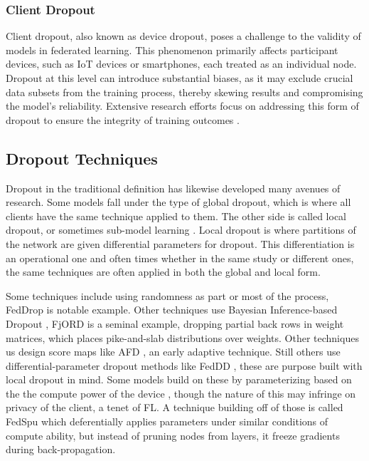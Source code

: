 \documentclass{article}
\begin{document}
\subsubsection{Client Dropout}
Client dropout, also known as device dropout, poses a challenge to the validity of models in federated learning. This phenomenon primarily affects participant devices, such as IoT devices or smartphones, each treated as an individual node. Dropout at this level can introduce substantial biases, as it may exclude crucial data subsets from the training process, thereby skewing results and compromising the model's reliability. Extensive research efforts focus on addressing this form of dropout to ensure the integrity of training outcomes \cite{mao2022communication, lim2021decentralized, shao2022dres}.

\subsection{Dropout Techniques}
Dropout in the traditional definition has likewise developed many avenues of research. Some models fall under the type of global dropout, which is where all clients have the same technique applied to them. The other side is called local dropout, or sometimes sub-model learning \cite{jia2022x}. Local dropout is where partitions of the network are given differential parameters for dropout. This differentiation is an operational one and often times whether in the same study or different ones, the same techniques are often applied in both the global and local form.

Some techniques include using randomness as part or most of the process\cite{wen2022federated,caldas2018expanding}, FedDrop is notable example. Other techniques use Bayesian Inference-based Dropout \cite{gal2016theoretically, xue2023fedbiad}, FjORD \cite{horvath2021fjord} is a seminal example, dropping partial back rows in weight matrices, which places pike-and-slab distributions over weights. Other techniques us design score maps like AFD \cite{nader2020adaptive}, an early adaptive technique. Still others use differential-parameter dropout methods like FedDD \cite{feng2023feddd,nader2020adaptive}, these are purpose built with local dropout in mind. Some models build on these by parameterizing based on the the compute power of the device \cite{wen2022federated, wang2024fluid}, though the nature of this may infringe on privacy of the client, a tenet of FL. A technique building off of those is called FedSpu \cite{niu2024fedspu} which deferentially applies parameters under similar conditions of compute ability, but instead of pruning nodes from layers, it freeze gradients during back-propagation.
\end{document}
